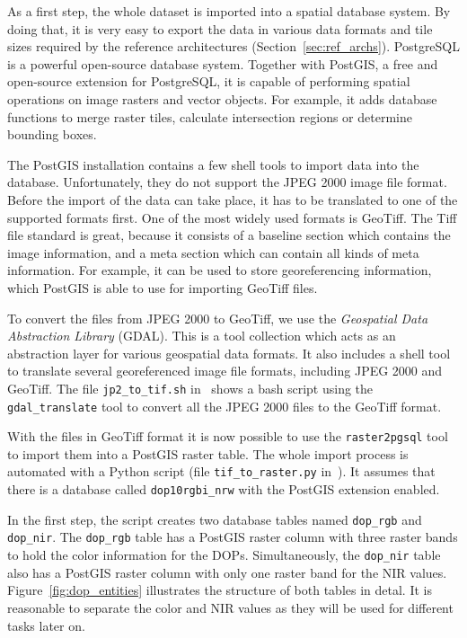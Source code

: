 As a first step, the whole dataset is imported into a spatial database system. By doing that, it is very easy to export the data in various data formats and tile sizes required by the reference architectures (Section~\ref{sec:ref_archs}). PostgreSQL is a powerful open-source database system. Together with PostGIS, a free and open-source extension for PostgreSQL, it is capable of performing spatial operations on image rasters and vector objects. For example, it adds database functions to merge raster tiles, calculate intersection regions or determine bounding boxes.

The PostGIS installation contains a few shell tools to import data into the database. Unfortunately, they do not support the JPEG 2000 image file format. Before the import of the data can take place, it has to be translated to one of the supported formats first. One of the most widely used formats is GeoTiff. The Tiff file standard is great, because it consists of a baseline section which contains the image information, and a meta section which can contain all kinds of meta information. For example, it can be used to store georeferencing information, which PostGIS is able to use for importing GeoTiff files.

To convert the files from JPEG 2000 to GeoTiff, we use the \emph{Geospatial Data Abstraction Library} (GDAL). This is a tool collection which acts as an abstraction layer for various geospatial data formats. It also includes a shell tool to translate several georeferenced image file formats, including JPEG 2000 and GeoTiff. The file \texttt{jp2\_to\_tif.sh} in~\cite{thesis-code20} shows a bash script using the \texttt{gdal\_translate} tool to convert all the JPEG 2000 files to the GeoTiff format.

With the files in GeoTiff format it is now possible to use the \texttt{raster2pgsql} tool to import them into a PostGIS raster table. The whole import process is automated with a Python script (file \texttt{tif\_to\_raster.py} in~\cite{thesis-code20}). It assumes that there is a database called \texttt{dop10rgbi\_nrw} with the PostGIS extension enabled.

In the first step, the script creates two database tables named \texttt{dop\_rgb} and \texttt{dop\_nir}. The \texttt{dop\_rgb} table has a PostGIS raster column with three raster bands to hold the color information for the DOPs. Simultaneously, the \texttt{dop\_nir} table also has a PostGIS raster column with only one raster band for the NIR values. Figure~\ref{fig:dop_entities} illustrates the structure of both tables in detal. It is reasonable to separate the color and NIR values as they will be used for different tasks later on.

